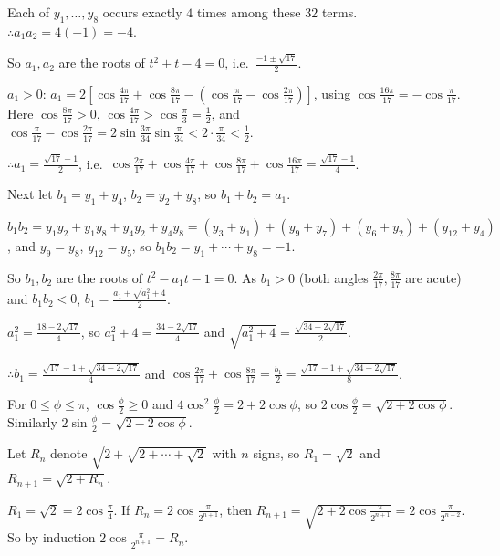   Each of $y_1, \ldots, y_8$ occurs exactly $4$ times among these $32$ terms. $\therefore a_1a_2 = 4(-1) = -4$.

  So $a_1, a_2$ are the roots of $t^2 + t - 4 = 0$, i.e.\ $\frac{-1\pm\sqrt{17}}{2}$.

  $a_1 > 0$: $a_1 = 2\left[\cos\frac{4\pi}{17} + \cos\frac{8\pi}{17} - \left(\cos\frac{\pi}{17} -
    \cos\frac{2\pi}{17}\right)\right]$, using $\cos\frac{16\pi}{17} = -\cos\frac{\pi}{17}$. Here $\cos\frac{8\pi}{17} >
  0$, $\cos\frac{4\pi}{17} > \cos\frac{\pi}{3} = \frac{1}{2}$, and $\cos\frac{\pi}{17} - \cos\frac{2\pi}{17} =
  2\sin\frac{3\pi}{34}\sin\frac{\pi}{34} < 2\cdot\frac{\pi}{34} < \frac{1}{2}$.

  $\therefore a_1 = \frac{\sqrt{17} - 1}{2}$, i.e.\ $\cos\frac{2\pi}{17} + \cos\frac{4\pi}{17} + \cos\frac{8\pi}{17}
  + \cos\frac{16\pi}{17} = \frac{\sqrt{17} - 1}{4}$.

  Next let $b_1 = y_1 + y_4$, $b_2 = y_2 + y_8$, so $b_1 + b_2 = a_1$.

  $b_1b_2 = y_1y_2 + y_1y_8 + y_4y_2 + y_4y_8 = (y_3 + y_1) + (y_9 + y_7) + (y_6 + y_2) + (y_{12} + y_4)$, and $y_9 =
  y_8$, $y_{12} = y_5$, so $b_1b_2 = y_1 + \cdots + y_8 = -1$.

  So $b_1, b_2$ are the roots of $t^2 - a_1t - 1 = 0$. As $b_1 > 0$ (both angles $\frac{2\pi}{17},
  \frac{8\pi}{17}$ are acute) and $b_1b_2 < 0$, $b_1 = \frac{a_1 + \sqrt{a_1^2 + 4}}{2}$.

  $a_1^2 = \frac{18 - 2\sqrt{17}}{4}$, so $a_1^2 + 4 = \frac{34 - 2\sqrt{17}}{4}$ and $\sqrt{a_1^2 + 4} =
  \frac{\sqrt{34 - 2\sqrt{17}}}{2}$.

  $\therefore b_1 = \frac{\sqrt{17} - 1 + \sqrt{34 - 2\sqrt{17}}}{4}$ and $\cos\frac{2\pi}{17} + \cos\frac{8\pi}{17}
  = \frac{b_1}{2} = \frac{\sqrt{17} - 1 + \sqrt{34 - 2\sqrt{17}}}{8}$.
\item For $0\leq\phi\leq\pi$, $\cos\frac{\phi}{2}\geq 0$ and $4\cos^2\frac{\phi}{2} = 2 + 2\cos\phi$, so
  $2\cos\frac{\phi}{2} = \sqrt{2 + 2\cos\phi}$. Similarly $2\sin\frac{\phi}{2} = \sqrt{2 - 2\cos\phi}$.

  Let $R_n$ denote $\sqrt{2 + \sqrt{2 + \cdots + \sqrt{2}}}$ with $n$ signs, so $R_1 = \sqrt{2}$ and $R_{n + 1} =
  \sqrt{2 + R_n}$.

  $R_1 = \sqrt{2} = 2\cos\frac{\pi}{4}$. If $R_n = 2\cos\frac{\pi}{2^{n + 1}}$, then $R_{n + 1} = \sqrt{2 +
    2\cos\frac{\pi}{2^{n + 1}}} = 2\cos\frac{\pi}{2^{n + 2}}$. So by induction $2\cos\frac{\pi}{2^{n + 1}} = R_n$.


